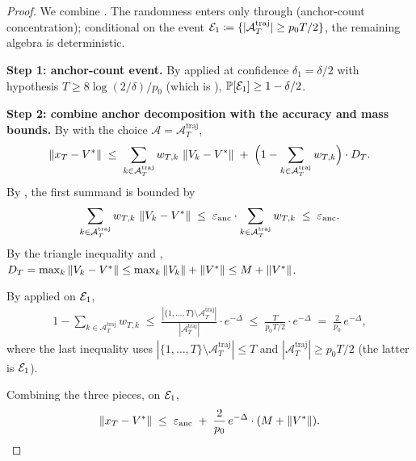 \begin{proof}
We combine .
The randomness enters only through 
(anchor-count concentration); conditional on the event
$\mathcal{E}_1 \coloneqq \{|\mathcal A^{\mathrm{traj}}_T| \ge p_0 T / 2\}$,
the remaining algebra is deterministic.

\noindent\textbf{Step 1: anchor-count event.}
By  applied at confidence $\delta_1 = \delta/2$
with hypothesis $T \ge 8 \log(2/\delta)/p_0$ (which is
), $\mathbb{P}[\mathcal{E}_1] \ge 1 - \delta/2$.

\noindent\textbf{Step 2: combine anchor decomposition with the accuracy
and mass bounds.}
By  with the choice
$\mathcal A = \mathcal A^{\mathrm{traj}}_T$,
\begin{align}\label{eq:T_poly_decomp_use}
   \left\| x_T - V^* \right\|
   \;\le\;
   \sum_{k \in \mathcal A^{\mathrm{traj}}_T} w_{T,k}\, \left\| V_k - V^* \right\|
   \;+\;
   \Big(1 - \sum_{k \in \mathcal A^{\mathrm{traj}}_T} w_{T,k}\Big) \cdot D_T.
\end{align}
By , the first summand is bounded by
\begin{align*}
   \sum_{k \in \mathcal A^{\mathrm{traj}}_T} w_{T,k}\, \left\| V_k - V^* \right\|
   \;\le\;
   \varepsilon_{\mathrm{anc}} \cdot
   \sum_{k \in \mathcal A^{\mathrm{traj}}_T} w_{T,k}
   \;\le\;
   \varepsilon_{\mathrm{anc}}.
\end{align*}
By the triangle inequality and ,
$D_T = \max_k \left\| V_k - V^* \right\| \le \max_k \left\| V_k \right\| + \left\| V^* \right\| \le M + \left\| V^* \right\|$.

By  applied on $\mathcal{E}_1$,
\begin{align*}
   1 - \sum_{k \in \mathcal A^{\mathrm{traj}}_T} w_{T,k}
   \;\le\;
   \frac{|\{1,\dots,T\} \setminus \mathcal A^{\mathrm{traj}}_T|}
        {|\mathcal A^{\mathrm{traj}}_T|}
   \cdot e^{-\Delta}
   \;\le\;
   \frac{T}{p_0 T / 2} \cdot e^{-\Delta}
   \;=\;
   \frac{2}{p_0}\, e^{-\Delta},
\end{align*}
where the last inequality uses
$|\{1,\dots,T\}\setminus \mathcal A^{\mathrm{traj}}_T| \le T$ and
$|\mathcal A^{\mathrm{traj}}_T| \ge p_0 T / 2$ (the latter is $\mathcal{E}_1$).

Combining the three pieces, on $\mathcal{E}_1$,
\begin{align}\label{eq:T_poly_combined}
   \left\| x_T - V^* \right\|
   \;\le\;
   \varepsilon_{\mathrm{anc}}
   \;+\;
   \frac{2}{p_0}\, e^{-\Delta} \cdot (M + \left\| V^* \right\|).
\end{align}


\end{proof}
